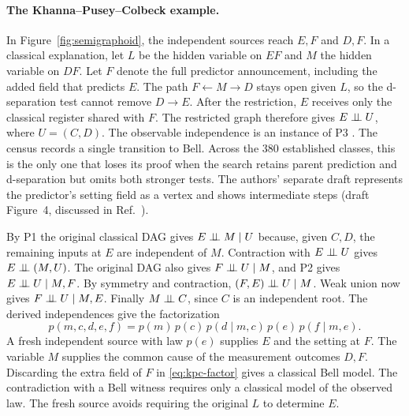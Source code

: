\paragraph{The Khanna--Pusey--Colbeck example.}
In Figure~\ref{fig:semigraphoid}, the independent sources reach \(E,F\)
and \(D,F\). In a classical explanation, let \(L\) be the hidden variable
on \(EF\) and \(M\) the hidden variable on \(DF\). Let \(F\) denote the full predictor
announcement, including the added field that predicts \(E\).
The path \(F\leftarrow M\to D\) stays open given \(L\), so the
d-separation test cannot remove \(D\to E\). After the restriction,
\(E\) receives only the classical register shared with \(F\).
The restricted graph therefore gives \(E\mathrel{\perp\!\!\!\perp} U\), where \(U=(C,D)\).
The observable independence is an instance of P3 \cite{KPC}.
The census records a single transition to Bell. Across the 380
established classes, this is the only one that loses its proof when
the search retains parent prediction and d-separation but omits both
stronger tests. The authors' separate
draft represents the predictor's setting field as a vertex and shows
intermediate steps (draft Figure~4, discussed in Ref.~\cite{KPCdraft}).

By P1 the original classical DAG gives \(E\mathrel{\perp\!\!\!\perp} M\mid U\) because, given \(C,D\), the remaining
inputs at \(E\) are independent of \(M\). Contraction with \(E\mathrel{\perp\!\!\!\perp} U\) gives
\(E\mathrel{\perp\!\!\!\perp}(M,U)\). The original DAG also gives \(F\mathrel{\perp\!\!\!\perp} U\mid M\), and P2
gives \(E\mathrel{\perp\!\!\!\perp} U\mid M,F\). By symmetry and contraction,
\((F,E)\mathrel{\perp\!\!\!\perp} U\mid M\). Weak union now gives \(F\mathrel{\perp\!\!\!\perp} U\mid M,E\).
Finally \(M\mathrel{\perp\!\!\!\perp} C\), since \(C\) is an independent root. The derived
independences give the factorization
\begin{equation}
 p(m,c,d,e,f)
 =p(m)\,p(c)\,p(d\mid m,c)\,p(e)\,p(f\mid m,e).
 \label{eq:kpc-factor}
\end{equation}
A fresh independent source with law \(p(e)\) supplies \(E\) and the
setting at \(F\). The variable \(M\) supplies the common cause of the
measurement outcomes \(D,F\). Discarding the extra field of \(F\) in
\eqref{eq:kpc-factor} gives a classical Bell model. The contradiction
with a Bell witness requires only a classical model of the observed
law. The fresh source avoids requiring the original \(L\) to determine
\(E\).

